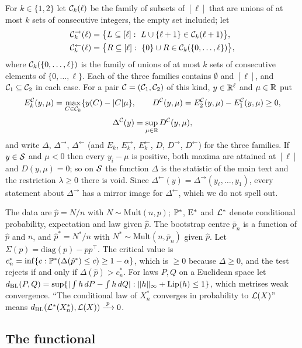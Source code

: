 For $k\in\{1,2\}$ let $\mathcal{C}_k(\ell)$ be the family of subsets of $[\ell]$ that are unions of at most $k$ sets of consecutive integers, the empty set included; let
\begin{align*}
\cC^{\to}_k(\ell)&=\bigl\{L\subseteq[\ell]:\ L\cup\{\ell+1\}\in\cC_k(\ell+1)\bigr\},\\
\cC^{\leftarrow}_k(\ell)&=\bigl\{R\subseteq[\ell]:\ \{0\}\cup R\in\cC_k(\{0,\dots,\ell\})\bigr\},
\end{align*}
where $\mathcal{C}_k(\{0,\dots,\ell\})$ is the family of unions of at most $k$ sets of consecutive elements of $\{0,\dots,\ell\}$.
Each of the three families contains $\emptyset$ and $[\ell]$, and $\mathcal{C}_1\subseteq\mathcal{C}_2$ in each case. For a pair $\mathcal{C}=(\mathcal{C}_1,\mathcal{C}_2)$ of this kind, $y\in\mathbb{R}^\ell$ and $\mu\in\mathbb{R}$ put
\[
E^{\mathcal{C}}_k(y,\mu)=\max_{C\in\mathcal{C}_k}\{y(C)-|C|\mu\},\qquad D^{\mathcal{C}}(y,\mu)=E^{\mathcal{C}}_2(y,\mu)-E^{\mathcal{C}}_1(y,\mu)\ge0,
\]
\[
\Delta^{\mathcal{C}}(y)=\sup_{\mu\in\mathbb{R}}D^{\mathcal{C}}(y,\mu),
\]
and write $\Delta$, $\Delta^{\to}$, $\Delta^{\leftarrow}$ (and $E_k$, $E^{\to}_k$, $E^{\leftarrow}_k$, $D$, $D^{\to}$, $D^{\leftarrow}$) for the three families. If $y\in\mathcal{S}$ and $\mu<0$ then every $y_i-\mu$ is positive, both maxima are attained at $[\ell]$ and $D(y,\mu)=0$; so on $\mathcal{S}$ the function $\Delta$ is the statistic of the main text and the restriction $\lambda\ge0$ there is void. Since $\Delta^{\leftarrow}(y)=\Delta^{\to}(y_\ell,\dots,y_1)$, every statement about $\Delta^{\to}$ has a mirror image for $\Delta^{\leftarrow}$, which we do not spell out.

The data are $\hat p=N/n$ with $N\sim\mathrm{Mult}(n,p)$; $\mathbb{P}^\ast$, $\mathrm{E}^\ast$ and $\mathcal{L}^\ast$ denote conditional probability, expectation and law given $\hat p$. The bootstrap centre $\bar p_n$ is a function of $\hat p$ and $n$, and $\hat p^\ast=N^\ast/n$ with $N^\ast\sim\mathrm{Mult}(n,\bar p_n)$ given $\hat p$. Let $\Sigma(p)=\mathrm{diag}(p)-pp^\top$. The critical value is $c^\ast_n=\inf\{c:\mathbb{P}^\ast(\Delta(\hat p^\ast)\le c)\ge1-\alpha\}$, which is $\ge0$ because $\Delta\ge0$, and the test rejects if and only if $\Delta(\hat p)>c^\ast_n$. For laws $P,Q$ on a Euclidean space let $d_{\mathrm{BL}}(P,Q)=\sup\{|\int h\,dP-\int h\,dQ|:\|h\|_\infty+\mathrm{Lip}(h)\le1\}$, which metrises weak convergence. ``The conditional law of $X^\ast_n$ converges in probability to $\mathcal{L}(X)$'' means $d_{\mathrm{BL}}(\mathcal{L}^\ast(X^\ast_n),\mathcal{L}(X))\xrightarrow{\;p\;}0$.

\subsection{The functional}\label{sec:supp-functional}

